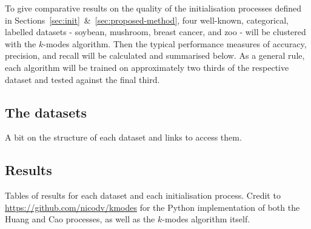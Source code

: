 To give comparative results on the quality of the initialisation processes 
defined in Sections~\ref{sec:init}~\&~\ref{sec:proposed-method}, four 
well-known, categorical, labelled datasets - soybean, mushroom, breast cancer, 
and zoo - will be clustered with the \(k\)-modes algorithm. Then the typical 
performance measures of accuracy, precision, and recall will be calculated and 
summarised below. As a general rule, each algorithm will be trained on 
approximately two thirds of the respective dataset and tested against the final 
third.

\begin{definition}\label{def:metrics}
\end{definition}


\subsection{The datasets}\label{subsec:datasets}

A bit on the structure of each dataset and links to access them.


\subsection{Results}\label{subsec:results}

Tables of results for each dataset and each initialisation process. Credit to 
\url{https://github.com/nicodv/kmodes} for the Python implementation of both the
Huang and Cao processes, as well as the $k$-modes algorithm itself.

\begin{example}
\begin{figure}
    \resizebox{\textwidth}{!}{%
    \centering
    
}
\end{figure}
\end{example}
